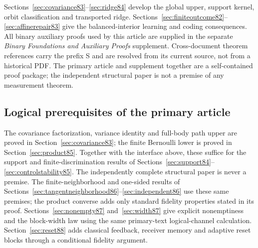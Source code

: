 Sections~\ref{sec:covariance83}--\ref{sec:ridge84} develop the global
upper, support kernel, orbit classification and transported ridge.
Sections~\ref{sec:finiteoutcome82}--\ref{sec:affinerepair83} give the
balanced-interior learning and coding consequences.
All binary auxiliary proofs used by this article are supplied in the
separate \emph{Binary Foundations and Auxiliary Proofs} supplement.
Cross-document theorem references carry the prefix S and are resolved
from its current source, not from a historical PDF.  The primary article
and supplement together are a self-contained proof package; the
independent structural paper is not a premise of any measurement theorem.

\subsection{Logical prerequisites of the primary article}
The covariance factorization, variance identity and full-body path
upper are proved in Section~\ref{sec:covariance83}; the finite
Bernoulli lower is proved in Section~\ref{sec:product85}.  Together
with the interface above, these suffice for the support and
finite-discrimination results of
Sections~\ref{sec:support84}--\ref{sec:controlstability85}.
The independently complete structural paper is never a premise.
The finite-neighborhood and one-sided results of
Sections~\ref{sec:tangentneighborhood86}--\ref{sec:independent86}
use these same premises; the product converse adds only standard
fidelity properties stated in its proof.  Sections~\ref{sec:nonempty87}
and~\ref{sec:width87} give explicit nonemptiness and the block-width
law using the same primary-text logical-channel calculation.
Section~\ref{sec:reset88} adds classical feedback, receiver memory
and adaptive reset blocks through a conditional fidelity argument.
